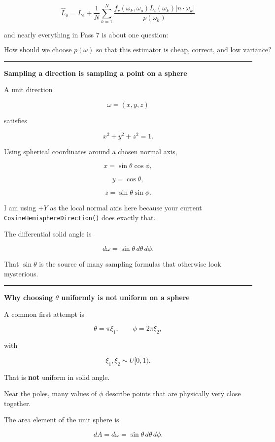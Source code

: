 \[
\boxed{
\hat L_o
=
L_e+
\frac{1}{N}
\sum_{k=1}^{N}
\frac{
f_r(\omega_k,\omega_o)
L_i(\omega_k)
|n\cdot\omega_k|
}{
p(\omega_k)
}
}
\]

and nearly everything in Pass 7 is about one question:

\[
\boxed{
\text{How should we choose }p(\omega)\text{ so that this estimator is cheap, correct, and low variance?}
}
\]

\begin{center}\rule{0.5\linewidth}{0.5pt}\end{center}

\textbf{Sampling a direction is sampling a point on a sphere}

A unit direction

\[
\omega=(x,y,z)
\]

satisfies

\[
x^2+y^2+z^2=1.
\]

Using spherical coordinates around a chosen normal axis,

\[
x=\sin\theta\cos\phi,
\]

\[
y=\cos\theta,
\]

\[
z=\sin\theta\sin\phi.
\]

I am using \(+Y\) as the local normal axis here because your current \texttt{CosineHemisphereDirection()} does exactly that.

The differential solid angle is

\[
\boxed{
d\omega=\sin\theta\,d\theta\,d\phi.
}
\]

That \(\sin\theta\) is the source of many sampling formulas that otherwise look mysterious.

\begin{center}\rule{0.5\linewidth}{0.5pt}\end{center}

\textbf{Why choosing \(\theta\) uniformly is not uniform on a sphere}

A common first attempt is

\[
\theta=\pi\xi_1,
\qquad
\phi=2\pi\xi_2,
\]

with

\[
\xi_1,\xi_2\sim U[0,1).
\]

That is \textbf{not} uniform in solid angle.

Near the poles, many values of \(\phi\) describe points that are physically very close together.

The area element of the unit sphere is

\[
dA=d\omega
=
\sin\theta\,d\theta\,d\phi.
\]

